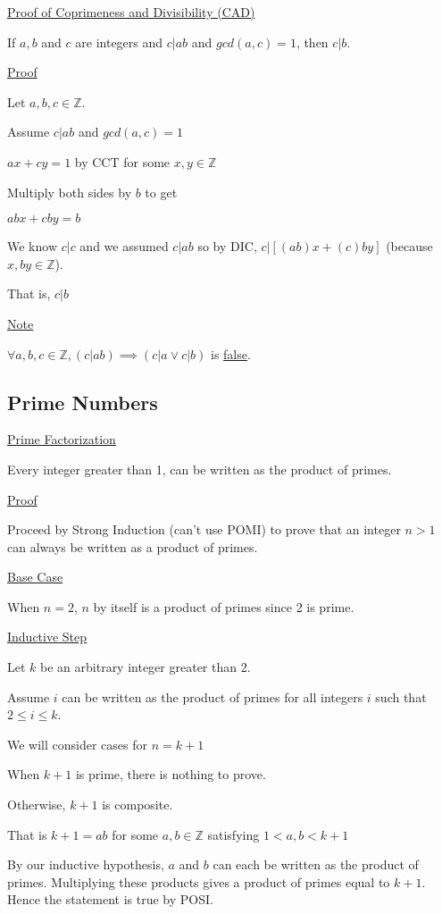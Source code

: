 \documentclass{article}
\begin{document}
\underline{Proof of Coprimeness and Divisibility (CAD)}

If $a,b$ and $c$ are integers and $c \vert ab$ and $gcd(a,c)=1$, then $c \vert b$.

\underline{Proof}

Let $a,b,c \in \mathbb{Z}$. 

Assume $c \vert ab$ and $gcd(a,c) = 1$

$ax + cy = 1$ by CCT for some $x,y \in \mathbb{Z}$

Multiply both sides by $b$ to get 

$abx + cby = b$

We know $c \vert c$ and we assumed $c \vert ab$ so by DIC, $c \vert [(ab) x + (c)by]$ (because $x, by \in \mathbb{Z}$).

That is, $c \vert b$

\underline{Note}

$\forall a,b,c \in \mathbb{Z}, (c \vert ab) \implies (c \vert a \vee c \vert b)$ is \underline{false}.


\subsection{Prime Numbers}

\underline{Prime Factorization}

Every integer greater than 1, can be written as the product of primes.

\underline{Proof}

Proceed by Strong Induction (can't use POMI) to prove that an integer $n > 1$ can always be written as a product of primes.

\underline{Base Case}

When $n=2$, $n$ by itself is a product of primes since 2 is prime.

\underline{Inductive Step}

Let $k$ be an arbitrary integer greater than 2. 

Assume $i$ can be written as the product of primes for all integers $i$ such that $2 \le i \le k$.

We will consider cases for $n = k+1$

When $k+1$ is prime, there is nothing to prove.

Otherwise, $k+1$ is composite. 

That is $k+1 = ab$ for some $a,b \in \mathbb{Z}$ satisfying $1 < a, b < k+1$

By our inductive hypothesis, $a$ and $b$ can each be written as the product of primes. Multiplying these products gives a product of primes equal to $k+1$. Hence the statement is true by POSI. 
\end{document}
